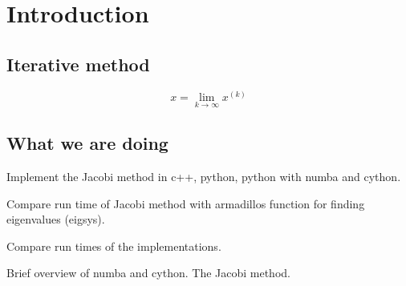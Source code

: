 \section{Introduction}

\subsection*{Iterative method}


\begin{equation}\label{eq:converge}
    x = \lim_{k \to \infty} x^{(k)}
\end{equation}

\subsection{What we are doing}

Implement the Jacobi method in c++, python, python with numba and cython.

Compare run time of Jacobi method with armadillos function for finding eigenvalues (eigsys).

Compare run times of the implementations.

Brief overview of numba and cython. The Jacobi method.
